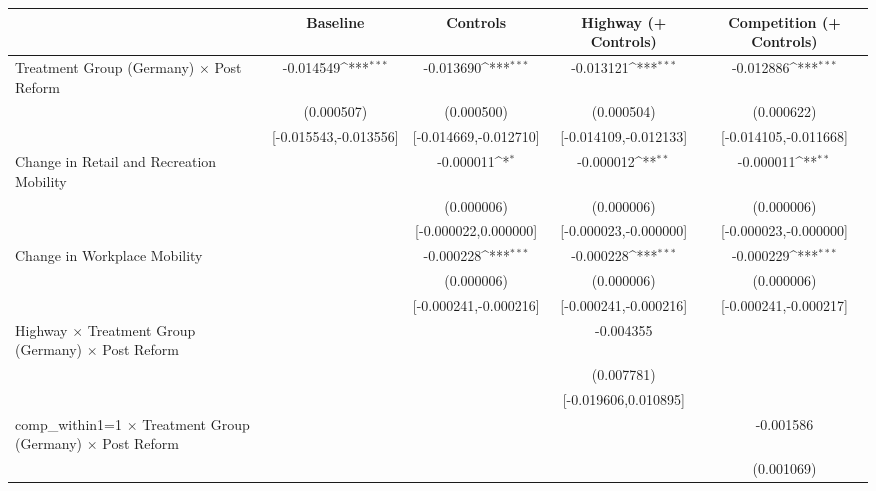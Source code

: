 {
\def\sym#1{\ifmmode^{#1}\else\(^{#1}\)\fi}
\begin{tabular}{l*{4}{c}}
\toprule
                    &\multicolumn{1}{c}{Baseline}&\multicolumn{1}{c}{Controls}&\multicolumn{1}{c}{Highway (+ Controls)}&\multicolumn{1}{c}{Competition (+ Controls)}\\
\midrule
Treatment Group (Germany) $\times$ Post Reform&   -0.014549\sym{***}&   -0.013690\sym{***}&   -0.013121\sym{***}&   -0.012886\sym{***}\\
                    &  (0.000507)         &  (0.000500)         &  (0.000504)         &  (0.000622)         \\
                    &[-0.015543,-0.013556]         &[-0.014669,-0.012710]         &[-0.014109,-0.012133]         &[-0.014105,-0.011668]         \\
Change in Retail and Recreation Mobility&                     &   -0.000011\sym{*}  &   -0.000012\sym{**} &   -0.000011\sym{**} \\
                    &                     &  (0.000006)         &  (0.000006)         &  (0.000006)         \\
                    &                     &[-0.000022,0.000000]         &[-0.000023,-0.000000]         &[-0.000023,-0.000000]         \\
Change in Workplace Mobility&                     &   -0.000228\sym{***}&   -0.000228\sym{***}&   -0.000229\sym{***}\\
                    &                     &  (0.000006)         &  (0.000006)         &  (0.000006)         \\
                    &                     &[-0.000241,-0.000216]         &[-0.000241,-0.000216]         &[-0.000241,-0.000217]         \\
Highway $\times$ Treatment Group (Germany) $\times$ Post Reform&                     &                     &   -0.004355         &                     \\
                    &                     &                     &  (0.007781)         &                     \\
                    &                     &                     &[-0.019606,0.010895]         &                     \\
comp\_within1=1 $\times$ Treatment Group (Germany) $\times$ Post Reform&                     &                     &                     &   -0.001586         \\
                    &                     &                     &                     &  (0.001069)         \\

\end{tabular}}
